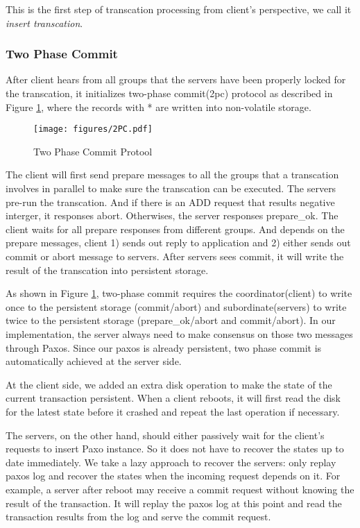 \documentclass{vldb}
\begin{document}
This is the first step of transcation processing from client's perspective, we call
it \textit{insert transcation}.


\subsubsection{Two Phase Commit}
\label{sec:2pc}

After client hears from all groups that the servers have been properly locked for the
transcation, it initializes two-phase commit(2pc) protocol as described in Figure
\ref{fig:2pc}, where the records with * are written into non-volatile storage.

\begin{figure}[h!]
  \centering
  \texttt{[image: figures/2PC.pdf]}
  \caption{Two Phase Commit Protool}
  \label{fig:2pc}
\end{figure}

The client will first send prepare messages to all the groups that a transcation
involves in parallel to make sure the transcation can be executed. The servers
pre-run the transcation. And if there is an ADD request that results negative
interger, it responses abort. Otherwises, the server responses prepare\_ok. The
client waits for all prepare responses from different groups. And depends on the
prepare messages, client 1) sends out reply to application and 2) either sends out
commit or abort message to servers. After servers sees commit, it will write the
result of the transcation into persistent storage.

As shown in Figure \ref{fig:2pc}, two-phase commit requires the coordinator(client)
to write once to the persistent storage (commit/abort) and subordinate(servers) to
write twice to the persistent storage (prepare\_ok/abort and commit/abort). In our
implementation, the server always need to make consensus on those two messages
through Paxos. Since our paxos is already persistent, two phase commit is
automatically achieved at the server side. 

At the client side, we added an extra disk operation to make the state of the current
transaction persistent. When a client reboots, it will first read the disk for the
latest state before it crashed and repeat the last operation if necessary. 

The servers, on the other hand, should either passively wait for the client’s
requests to insert Paxo instance. So it does not have to recover the states up to
date immediately. We take a lazy approach to recover the servers: only replay paxos
log and recover the states when the incoming request depends on it. For example, a
server after reboot may receive a commit request without knowing the result of the
transaction. It will replay the paxos log at this point and read the transaction
results from the log and serve the commit request.
\end{document}
